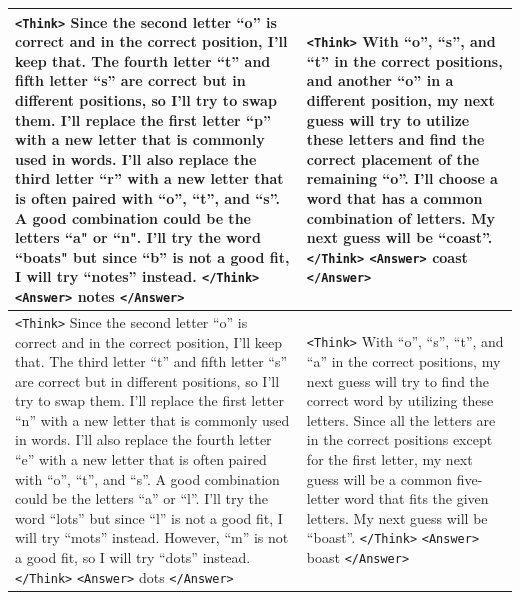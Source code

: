 \documentclass{article}
\theoremstyle{plain}
\theoremstyle{definition}
\theoremstyle{remark}
\begin{document}
\begin{table}[h]
{\begin{tabular}{|p{7cm} | p{7cm}|}
        \hline
        \texttt{<Think>} Since the second letter ``o'' is correct and in the correct position, I'll keep that. The fourth letter ``t'' and fifth letter ``s'' are correct but in different positions, so I'll try to swap them. I'll replace the first letter ``p'' with a new letter that is commonly used in words. I'll also replace the third letter ``r'' with a new letter that is often paired with ``o'', ``t'', and ``s''. A good combination could be the letters ``a" or ``n". I'll try the word ``boats" but since ``b'' is not a good fit, I will try ``notes'' instead. \texttt{</Think>} \texttt{<Answer>} notes \texttt{</Answer>} & \texttt{<Think>} With ``o'', ``s'', and ``t'' in the correct positions, and another ``o'' in a different position, my next guess will try to utilize these letters and find the correct placement of the remaining ``o''. I'll choose a word that has a common combination of letters. My next guess will be ``coast''. \texttt{</Think>} \texttt{<Answer>} coast \texttt{</Answer>} \\
        \hline
        \texttt{<Think>} Since the second letter ``o'' is correct and in the correct position, I'll keep that. The third letter ``t'' and fifth letter ``s'' are correct but in different positions, so I'll try to swap them. I'll replace the first letter ``n'' with a new letter that is commonly used in words. I'll also replace the fourth letter ``e'' with a new letter that is often paired with ``o'', ``t'', and ``s''. A good combination could be the letters ``a'' or ``l''. I'll try the word ``lots'' but since ``l'' is not a good fit, I will try ``mots'' instead. However, ``m'' is not a good fit, so I will try ``dots'' instead. \texttt{</Think>} \texttt{<Answer>} dots \texttt{</Answer>}
        & \texttt{<Think>} With ``o'', ``s'', ``t'', and ``a'' in the correct positions, my next guess will try to find the correct word by utilizing these letters. Since all the letters are in the correct positions except for the first letter, my next guess will be a common five-letter word that fits the given letters. My next guess will be ``boast''. \texttt{</Think>} \texttt{<Answer>} boast \texttt{</Answer>} \\
        \hline

\end{tabular}}
\end{table}
\end{document}
